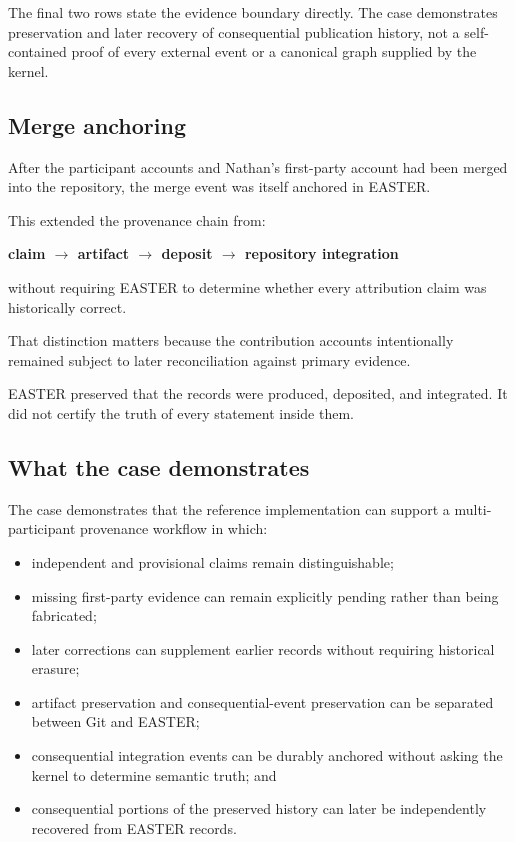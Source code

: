 \documentclass[11pt]{article}
\begin{document}
The final two rows state the evidence boundary directly. The case demonstrates preservation and later recovery of consequential publication history, not a self-contained proof of every external event or a canonical graph supplied by the kernel.

\subsection{Merge anchoring}

After the participant accounts and Nathan's first-party account had been merged into the repository, the merge event was itself anchored in EASTER.

This extended the provenance chain from:

\textbf{claim $\rightarrow$ artifact $\rightarrow$ deposit $\rightarrow$ repository integration}

without requiring EASTER to determine whether every attribution claim was historically correct.

That distinction matters because the contribution accounts intentionally remained subject to later reconciliation against primary evidence.

EASTER preserved that the records were produced, deposited, and integrated. It did not certify the truth of every statement inside them.

\subsection{What the case demonstrates}

The case demonstrates that the reference implementation can support a multi-participant provenance workflow in which:

\begin{itemize}
\item independent and provisional claims remain distinguishable;
\item missing first-party evidence can remain explicitly pending rather than being fabricated;
\item later corrections can supplement earlier records without requiring historical erasure;
\item artifact preservation and consequential-event preservation can be separated between Git and EASTER;
\item consequential integration events can be durably anchored without asking the kernel to determine semantic truth; and
\item consequential portions of the preserved history can later be independently recovered from EASTER records.
\end{itemize}
\end{document}
